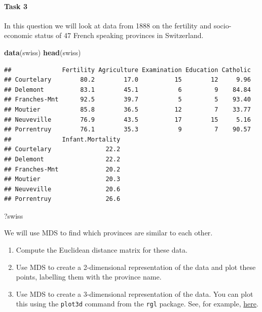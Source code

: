 \documentclass[
]{book}
\newenvironment{Shaded}{\begin{snugshade}}{\end{snugshade}}
\newcommand{\FunctionTok}[1]{\textcolor[rgb]{0.13,0.29,0.53}{\textbf{#1}}}
\newcommand{\NormalTok}[1]{#1}
\theoremstyle{definition}
\theoremstyle{definition}
\theoremstyle{definition}
\theoremstyle{definition}
\theoremstyle{remark}
\begin{document}
\hypertarget{task-3-1}{%
\paragraph*{Task 3}\label{task-3-1}}

In this question we will look at data from 1888 on the fertility and socio-economic status of 47 French speaking provinces in Switzerland.

\begin{Shaded}
\begin{Highlighting}[]
\FunctionTok{data}\NormalTok{(swiss)}
\FunctionTok{head}\NormalTok{(swiss)}
\end{Highlighting}
\end{Shaded}

\begin{verbatim}
##              Fertility Agriculture Examination Education Catholic
## Courtelary        80.2        17.0          15        12     9.96
## Delemont          83.1        45.1           6         9    84.84
## Franches-Mnt      92.5        39.7           5         5    93.40
## Moutier           85.8        36.5          12         7    33.77
## Neuveville        76.9        43.5          17        15     5.16
## Porrentruy        76.1        35.3           9         7    90.57
##              Infant.Mortality
## Courtelary               22.2
## Delemont                 22.2
## Franches-Mnt             20.2
## Moutier                  20.3
## Neuveville               20.6
## Porrentruy               26.6
\end{verbatim}

\begin{Shaded}
\begin{Highlighting}[]
\NormalTok{?swiss}
\end{Highlighting}
\end{Shaded}

We will use MDS to find which provinces are similar to each other.

\begin{enumerate}
\def\labelenumi{\roman{enumi}.}
\item
  Compute the Euclidean distance matrix for these data.
\item
  Use MDS to create a 2-dimensional representation of the data and plot these points, labelling them with the province name.
\item
  Use MDS to create a 3-dimensional representation of the data. You can plot this using the \texttt{plot3d} command from the \texttt{rgl} package. See, for example, \href{https://rpubs.com/aagarwal29/179912}{here}.
\end{enumerate}
\end{document}
